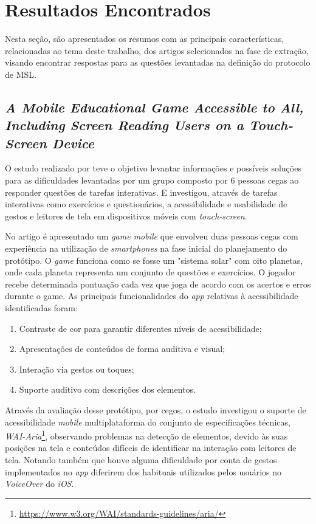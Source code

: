 \newpage{}

\section{Resultados Encontrados}

Nesta seção, são apresentados os resumos com as principais características, relacionadas ao tema deste trabalho, dos artigos selecionados na fase de extração, visando encontrar respostas para as questões levantadas na definição do protocolo de MSL.

\subsection{\emph{A Mobile Educational Game Accessible to All, Including Screen Reading Users on a Touch-Screen Device}}

O estudo realizado por  teve o objetivo levantar informações e possíveis soluções para as dificuldades levantadas por um grupo composto por 6 pessoas cegas ao responder questões de tarefas interativas. E investigou, através de tarefas interativas como exercícios e questionários, a acessibilidade e usabilidade de gestos e leitores de tela em dispositivos móveis com \emph{touch-screen}.

No artigo é apresentado um \emph{game mobile} que envolveu duas pessoas cegas com experiência na utilização de \emph{smartphones} na fase inicial do planejamento do protótipo. O \emph{game} funciona como se fosse um "sistema solar" com oito planetas, onde cada planeta representa um conjunto de questões e exercícios. O jogador recebe determinada pontuação cada vez que joga de acordo com os acertos e erros durante o game. As principais funcionalidades do \emph{app} relativas à acessibilidade identificadas foram:

\begin{enumerate}
\item Contraste de cor para garantir diferentes níveis de acessibilidade;
\item Apresentações de conteúdos de forma auditiva e visual;
\item Interação via gestos ou toques;
\item Suporte auditivo com descrições dos elementos.
\end{enumerate}

Através da avaliação desse protótipo, por cegos, o estudo investigou o suporte de acessibilidade \emph{mobile} multiplataforma do conjunto de especificações técnicas, \emph{WAI-Aria}\footnote{\url{https://www.w3.org/WAI/standards-guidelines/aria/}}, observando problemas na detecção de elementos, devido às suas posições na tela e conteúdos difíceis de identificar na interação com leitores de tela. Notando também que houve alguma dificuldade por conta de gestos implementados no \emph{app} diferirem dos habituais utilizados pelos usuários no \emph{VoiceOver} do \emph{iOS}.

